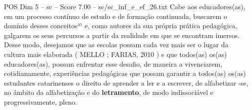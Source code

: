 \begin{textsample}{POS Dim 5 – sc – Score 7.00 – sc/sc\_inf\_e\_ef\_26.txt}
Cabe aos educadores(as), em um processo contínuo de estudo e de formação continuada, buscarem o domínio desses conceitos³¹ e, como autores da sua própria prática pedagógica, galgarem os seus percursos a partir da realidade em que se encontram imersos.
Desse modo, desejamos que as escolas possam cada vez mais ser o lugar da cultura mais elaborada ( MELLO ; FARIAS, 2010 ) e que todos(as) os(as) educadores(as), possam enfrentar esse desafio, de maneira a vivenciarem, cotidianamente, experiências pedagógicas que possam garantir a todos(as) os(as) estudantes catarinenses o direito de aprender a ler e a escrever, de alfabetizar -se, no âmbito da alfabetização e do \textbf{letramento}, de modo indissociável e progressivamente, pleno.

\end{textsample}
